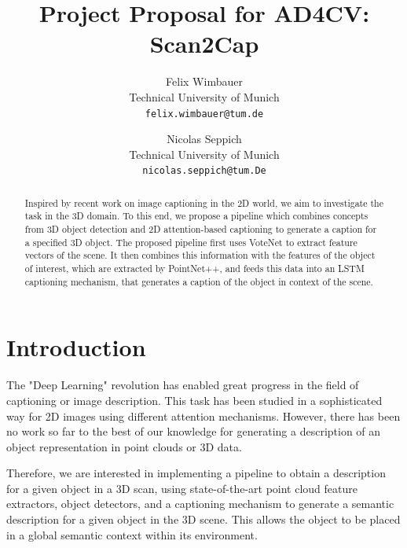 \documentclass[10pt,twocolumn,letterpaper]{article}
\begin{document}
\title{Project Proposal for AD4CV: Scan2Cap}

\author{Felix Wimbauer\\
Technical University of Munich\\
{\tt\small felix.wimbauer@tum.de}
\and
Nicolas Seppich\\
Technical University of Munich\\
{\tt\small nicolas.seppich@tum.De}
}

\maketitle

\begin{abstract}
	Inspired by recent work on image captioning in the 2D world, we aim to investigate the task in the 3D domain. To this end, we propose a pipeline which combines concepts from 3D object detection and 2D attention-based captioning to generate a caption for a specified 3D object. The proposed pipeline first uses VoteNet to extract feature vectors of the scene. It then combines this information with the features of the object of interest, which are extracted by PointNet++, and feeds this data into an LSTM captioning mechanism, that generates a caption of the object in context of the scene.  
   
\end{abstract}

\section{Introduction}

The "Deep Learning" revolution has enabled great progress in the field of captioning or image description. This task has been studied in a sophisticated way for 2D images using different attention mechanisms.
However, there has been no work so far to the best of our knowledge for generating a description of an object representation in point clouds or 3D data.

Therefore, we are interested in implementing a pipeline to obtain a description for a given object in a 3D scan, using state-of-the-art point cloud feature extractors, object detectors, and a captioning mechanism to generate a semantic description for a given object in the 3D scene. This allows the object to be placed in a global semantic context within its environment.
 
\end{document}
